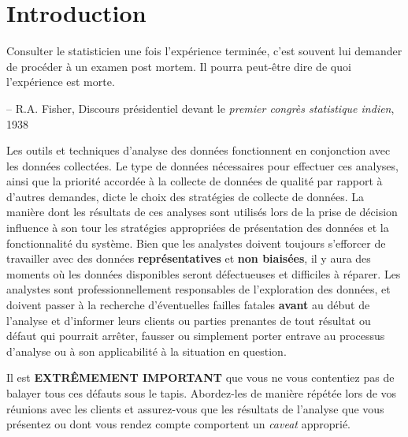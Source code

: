 \newpage\section{Introduction}
\begin{tcolorbox}[title=La maxime de Fisher]
Consulter le statisticien une fois l'expérience terminée, c'est souvent lui demander de procéder à un examen post mortem. Il pourra peut-être dire de quoi l'expérience est morte. \\[-0.6cm]
\begin{flushright}
-- R.A. Fisher, Discours présidentiel devant le \textit{premier congrès statistique indien}, 1938
\end{flushright}
\end{tcolorbox}
\noindent Les outils et techniques d'analyse des données fonctionnent en conjonction avec les données collectées. Le type de données nécessaires pour effectuer ces analyses, ainsi que la priorité accordée à la collecte de données de qualité par rapport à d'autres demandes, dicte le choix des stratégies de collecte de données. La manière dont les résultats de ces analyses sont utilisés lors de la prise de décision influence à son tour les stratégies appropriées de présentation des données et la fonctionnalité du système.  
\newl Bien que les analystes doivent toujours s'efforcer de travailler avec des données \textbf{représentatives} et \textbf{non biaisées}, il y aura des moments où les données disponibles seront défectueuses et difficiles à réparer. Les analystes sont professionnellement responsables de l'exploration des données, et doivent passer à la recherche d'éventuelles failles fatales \textbf{avant} au début de l'analyse et d'informer leurs clients ou parties prenantes de tout résultat ou d\'efaut qui pourrait arrêter, fausser ou simplement porter entrave au processus d'analyse ou à son applicabilité à la situation en question. 
\par Il est \textbf{EXTRÊMEMENT IMPORTANT} que vous ne vous contentiez pas de balayer tous ces défauts sous le tapis. Abordez-les de manière répétée lors de vos réunions avec les clients et assurez-vous que les résultats de l'analyse que vous présentez ou dont vous rendez compte comportent un \textit{caveat} approprié. 
